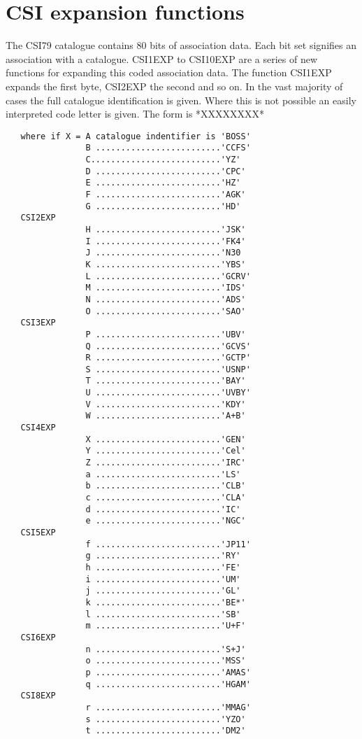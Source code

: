 \section {CSI expansion functions}
The CSI79 catalogue contains 80 bits of association data. Each bit set signifies
an association with a catalogue.
CSI1EXP to CSI10EXP are a series of new functions for expanding this coded
association data. The function CSI1EXP expands
the first byte, CSI2EXP the second and so on. In the vast majority of cases
the full catalogue identification is given. Where this is not possible
an easily interpreted code letter is given. The form is
*XXXXXXXX*
\begin{verbatim}
   where if X = A catalogue indentifier is 'BOSS'
                B .........................'CCFS'
                C..........................'YZ'
                D .........................'CPC'
                E .........................'HZ'
                F .........................'AGK'
                G .........................'HD'
   CSI2EXP
                H .........................'JSK'
                I .........................'FK4'
                J .........................'N30
                K .........................'YBS'
                L .........................'GCRV'
                M .........................'IDS'
                N .........................'ADS'
                O .........................'SAO'
   CSI3EXP
                P .........................'UBV'
                Q .........................'GCVS'
                R .........................'GCTP'
                S .........................'USNP'
                T .........................'BAY'
                U .........................'UVBY'
                V .........................'KDY'
                W .........................'A+B'
   CSI4EXP
                X .........................'GEN'
                Y .........................'Cel'
                Z .........................'IRC'
                a .........................'LS'
                b .........................'CLB'
                c .........................'CLA'
                d .........................'IC'
                e .........................'NGC'
   CSI5EXP
                f .........................'JP11'
                g .........................'RY'
                h .........................'FE'
                i .........................'UM'
                j .........................'GL'
                k .........................'BE*'
                l .........................'SB'
                m .........................'U+F'
   CSI6EXP
                n .........................'S+J'
                o .........................'MSS'
                p .........................'AMAS'
                q .........................'HGAM'
   CSI8EXP
                r .........................'MMAG'
                s .........................'YZO'
                t .........................'DM2'

\end{verbatim}


